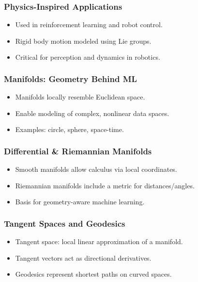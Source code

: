 \begin{frame}[fragile]\frametitle{Physics-Inspired Applications}
  \begin{itemize}
    \item Used in reinforcement learning and robot control.
    \item Rigid body motion modeled using Lie groups.
    \item Critical for perception and dynamics in robotics.
  \end{itemize}
\end{frame}

\begin{frame}[fragile]\frametitle{Manifolds: Geometry Behind ML}
  \begin{itemize}
    \item Manifolds locally resemble Euclidean space.
    \item Enable modeling of complex, nonlinear data spaces.
    \item Examples: circle, sphere, space-time.
  \end{itemize}
\end{frame}

\begin{frame}[fragile]\frametitle{Differential \& Riemannian Manifolds}
  \begin{itemize}
    \item Smooth manifolds allow calculus via local coordinates.
    \item Riemannian manifolds include a metric for distances/angles.
    \item Basis for geometry-aware machine learning.
  \end{itemize}
\end{frame}

\begin{frame}[fragile]\frametitle{Tangent Spaces and Geodesics}
  \begin{itemize}
    \item Tangent space: local linear approximation of a manifold.
    \item Tangent vectors act as directional derivatives.
    \item Geodesics represent shortest paths on curved spaces.
  \end{itemize}
\end{frame}

